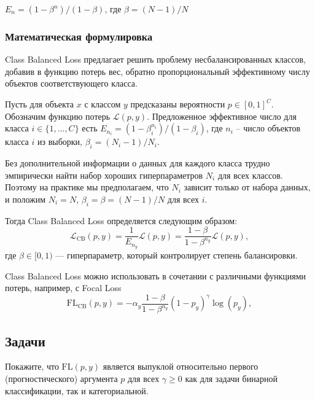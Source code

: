 \begin{proposition}
    $E_n=(1-\beta^n)/(1-\beta)$, где $\beta=(N-1)/N$
\end{proposition}

\subsubsection*{Математическая формулировка}

Class Balanced Loss предлагает решить проблему несбалансированных классов, добавив в функцию потерь вес, обратно пропорциональный эффективному числу объектов соответствующего класса. 

Пусть для объекта $x$ с классом $y$ предсказаны вероятности $p\in[0,1]^C$. Обозначим функцию потерь $\mathcal{L}(p,y)$. Предложенное эффективное число для класса $i\in\{1,\ldots,C\}$ есть $E_{n_i}=(1-\beta_i^{n_i})/(1-\beta_i)$, где $n_i$ -- число объектов класса $i$ из выборки, $\beta_i=(N_i-1)/N_i$.

Без дополнительной информации о данных для каждого класса трудно эмпирически найти набор хороших гиперпараметров $N_i$ для всех классов. Поэтому на практике мы предполагаем, что $N_i$ зависит только от набора данных, и положим $N_i = N$, $\beta_i = \beta = (N - 1)/N$ для всех $i$.

Тогда Class Balanced Loss определяется следующим образом:
\[
    \mathcal{L}_\text{CB}(p,y) = \dfrac{1}{E_{n_y}}\mathcal{L}(p,y) = \dfrac{1-\beta}{1-\beta^{n_y}}\mathcal{L}(p,y),
\]
где $\beta \in [0,1)$ — гиперпараметр, который контролирует степень балансировки.

\begin{remark}
    Class Balanced Loss можно использовать в сочетании с различными функциями потерь, например, с Focal Loss
    \[
        \text{FL}_\text{CB}(p,y)=-\alpha_y\dfrac{1-\beta}{1-\beta^{n_y}}(1-p_y)^\gamma\log(p_y),
    \]
\end{remark}

\subsection*{Задачи}

\begin{problem}
    Покажите, что $\text{FL}(p,y)$ является выпуклой относительно первого (прогностического) аргумента $p$ для всех $\gamma \ge 0$ как для задачи бинарной классификации, так и категориальной.
\end{problem}

